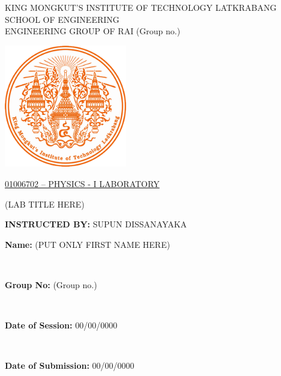 \documentclass[12pt,a4paper]{article}
\newcommand{\groupNumber}{(Group no.)} %
\newcommand{\labTitle}{(LAB TITLE HERE)} %
\newcommand{\studentNames}{(PUT ONLY FIRST NAME HERE)} %
\newcommand{\sessionDate}{00/00/0000} %
\newcommand{\submissionDate}{00/00/0000} %
\begin{document}
\begin{center}
	\vspace*{36pt}

	{\fontsize{14}{16}\selectfont
		KING MONGKUT’S INSTITUTE OF TECHNOLOGY LATKRABANG\\
		SCHOOL OF ENGINEERING\\
		ENGINEERING GROUP OF RAI \groupNumber
	}

	\vspace{42pt}

	\includegraphics[width=0.4\textwidth]{kmitl_logo.png}

	\vspace{56pt}

	{\fontsize{16}{18}\selectfont
		\underline{01006702 – PHYSICS - I LABORATORY}\\
	}

	\vspace{32pt}

	\labTitle

	\vspace{60pt}

	\begin{flushleft}
		\textbf{INSTRUCTED BY:} \quad SUPUN DISSANAYAKA
	\end{flushleft}

	\vfill

	\begin{flushright}
		\parbox{8cm}{\textbf{Name:} \studentNames}\\
		\parbox{8cm}{\textbf{Group No:} \groupNumber}\\
		\parbox{8cm}{\textbf{Date of Session:} \sessionDate}\\
		\parbox{8cm}{\textbf{Date of Submission:} \submissionDate}
	\end{flushright}

	\vspace{36pt}
\end{center}

\newpage
\end{document}
